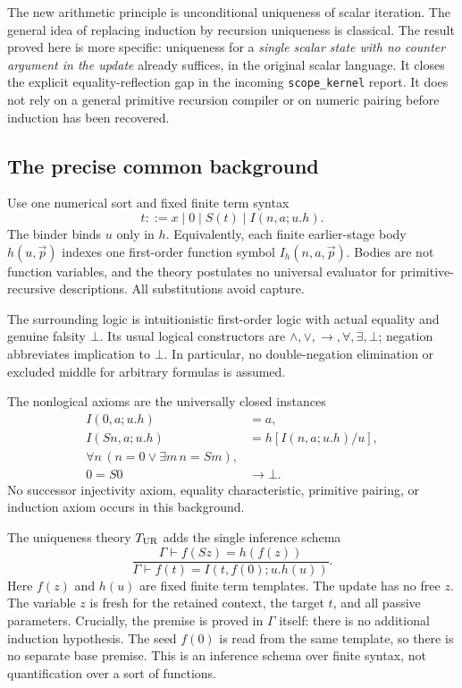 \documentclass[11pt]{article}
\begin{document}
The new arithmetic principle is unconditional uniqueness of scalar
iteration.  The general idea of replacing induction by recursion
uniqueness is classical.  The result proved here is more specific:
uniqueness for a \emph{single scalar state with no counter argument in
the update} already suffices, in the original scalar language.  It
closes the explicit equality-reflection gap in the incoming
\texttt{scope\_kernel} report.  It does not rely on a general primitive
recursion compiler or on numeric pairing before induction has been
recovered.

\subsection{The precise common background}
Use one numerical sort and fixed finite term syntax
\[
 t ::= x\mid0\mid S(t)\mid I(n,a;u.h).
\]
The binder binds $u$ only in $h$.  Equivalently, each finite earlier-stage
body $h(u,\vec p)$ indexes one first-order function symbol
$I_h(n,a,\vec p)$.  Bodies are not function variables, and the theory
postulates no universal evaluator for primitive-recursive descriptions.
All substitutions avoid capture.

The surrounding logic is intuitionistic first-order logic with actual
equality and genuine falsity $\bot$.  Its usual logical constructors are
$\land,\lor,\to,\forall,\exists,\bot$; negation abbreviates implication
to $\bot$.  In particular, no double-negation elimination or excluded
middle for arbitrary formulas is assumed.

The nonlogical axioms are the universally closed instances
\begin{align*}
 I(0,a;u.h)&=a,\\
 I(Sn,a;u.h)&=h[I(n,a;u.h)/u],\\
 \forall n\,(n=0\lor\exists m\,n=Sm),&\\
 0=S0&\longrightarrow\bot.
\end{align*}
No successor injectivity axiom, equality characteristic, primitive
pairing, or induction axiom occurs in this background.

The uniqueness theory $T_{\rm UR}$ adds the single inference schema
\[
 \boxed{\qquad
 \frac{\Gamma\vdash f(Sz)=h(f(z))}
      {\Gamma\vdash f(t)=I(t,f(0);u.h(u))}.
 \qquad}                                                \tag{UR}
\]
Here $f(z)$ and $h(u)$ are fixed finite term templates.  The update has
no free $z$.  The variable $z$ is fresh for the retained context,
the target $t$, and all passive parameters.  Crucially, the premise is
proved in $\Gamma$ itself: there is no additional induction hypothesis.
The seed $f(0)$ is read from the same template, so there is no separate
base premise.  This is an inference schema over finite syntax, not
quantification over a sort of functions.
\end{document}
